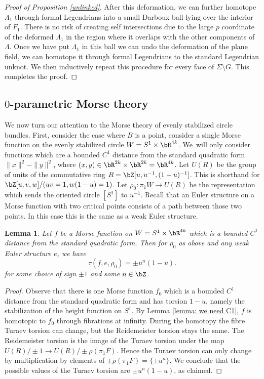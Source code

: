 \documentclass[JEP,XML,SOM,Unicode,NoFloatCountersInSection]{cedram}
\theoremstyle{plain}
\newtheorem{lemma}[theorem]{Lemma}
\theoremstyle{definition}
\begin{document}
\begin{proof}[Proof of Proposition \ref{unlinked}]
After this deformation, we can further homotope $\Lambda_1$ through formal Legendrians into a small Darboux ball lying over the interior of $F_1$. There is no risk of creating self intersections due to the large $p$ coordinate of the deformed $\Lambda_1$ in the region where it overlaps with the other components of $\Lambda$. Once we have put $\Lambda_1$ in this ball we can undo the deformation of the plane field, \ie we can homotope it through formal Legendrians to the standard Legendrian unknot. We then inductively repeat this procedure for every face of $\Sigma \setminus G$. This completes the proof. \end{proof}

\subsection{$0$-parametric Morse theory}

We now turn our attention to the Morse theory of evenly stabilized circle bundles. First, consider the case where $B$ is a point, \ie consider a single Morse function on the evenly stabilized circle $W=S^1\times \bR^{4k}$. We~will only consider functions which are a bounded $C^1$ distance from the standard quadratic form $\|x\|^2-\|y\|^2$, where $(x,y) \in \bR^{2k} \times \bR^{2k}=\bR^{4k}$. Let $U(R)$ be the group of units of the commutative ring $R=\bZ[u,u^{-1},(1-u)^{-1}]$. This is shorthand for \hbox{$\bZ[u,v,w]/(uv=1,w(1-u)=1)$}. Let $\rho_0:\pi_1W \to U(R)$ be the representation which sends the oriented circle $[S^1]$ to $u^{-1}$. Recall that an Euler structure on a Morse function with two critical points consists of a path between those two points. In this case this is the same as a weak Euler structure.

\begin{lemma}\label{Lemma 0}
Let $f$ be a Morse function on $W=S^1\times \bR^{4k}$ which is a bounded $C^1$ distance from the standard quadratic form. Then for $\rho_0$ as above and any weak Euler structure $e$, we have
\[
\tau(f,e,\rho_0)=\pm u^n(1-u).
\]
for some choice of sign $\pm1$ and some $n \in \bZ$.
\end{lemma}

\begin{proof}
Observe that there is one Morse function $f_0$ which is a bounded $C^1$ distance from the standard quadratic form and has torsion $1-u$, namely the stabilization of the height function on $S^1$. By Lemma \ref{lemma: we need C1}, $f$ is homotopic to $f_0$ through fibrations at infinity. During the homotopy the fibre Turaev torsion can change, but the Reidemeister torsion stays the same. The Reidemeister torsion is the image of the Turaev torsion under the map $U(R) / \pm 1 \to U(R)/\pm \rho(\pi_1F)$. Hence the Turaev torsion can only change by multiplication by elements of $\pm \rho(\pi_1F)=\{\pm u^n\}$. We conclude that the possible values of the Turaev torsion are $\pm u^n(1-u)$, as claimed.
\end{proof}
\end{document}
